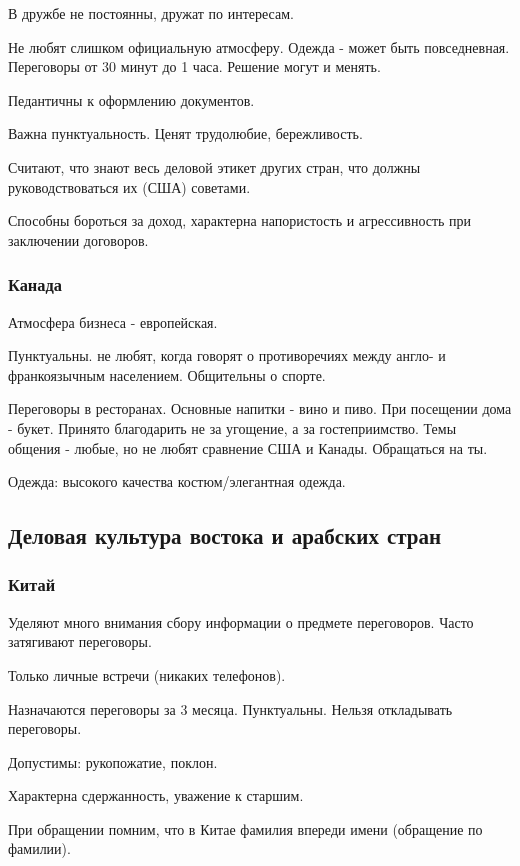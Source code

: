 \documentclass[a4paper,14pt]{extarticle}
\begin{document}
В дружбе не постоянны, дружат по интересам.

Не любят слишком официальную атмосферу. Одежда - может быть повседневная. Переговоры от 30 минут до 1 часа. Решение могут и менять.

Педантичны к оформлению документов.

Важна пунктуальность. Ценят трудолюбие, бережливость.

Считают, что знают весь деловой этикет других стран, что должны руководствоваться их (США) советами.

Способны бороться за доход, характерна напористость и агрессивность при заключении договоров.

\subsubsection{Канада}

Атмосфера бизнеса - европейская.

Пунктуальны. не любят, когда говорят о противоречиях между англо- и франкоязычным населением. Общительны о спорте.

Переговоры в ресторанах. Основные напитки - вино и пиво. При посещении дома - букет. Принято благодарить не за угощение, а за гостеприимство. Темы общения - любые, но не любят сравнение США и Канады. Обращаться на ты.

Одежда: высокого качества костюм/элегантная одежда.

\subsection{Деловая культура востока и арабских стран}

\subsubsection{Китай}

Уделяют много внимания сбору информации о предмете переговоров. Часто затягивают переговоры.

Только личные встречи (никаких телефонов).

Назначаются переговоры за 3 месяца. Пунктуальны. Нельзя откладывать переговоры.

Допустимы: рукопожатие, поклон.

Характерна сдержанность, уважение к старшим.

При обращении помним, что в Китае фамилия впереди имени (обращение по фамилии).
\end{document}
